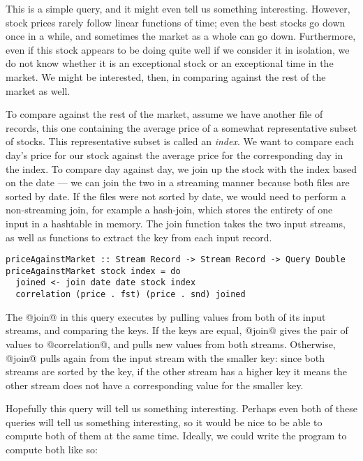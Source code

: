 This is a simple query, and it might even tell us something interesting.
However, stock prices rarely follow linear functions of time; even the best stocks go down once in a while, and sometimes the market as a whole can go down.
Furthermore, even if this stock appears to be doing quite well if we consider it in isolation, we do not know whether it is an exceptional stock or an exceptional time in the market.
We might be interested, then, in comparing against the rest of the market as well.

To compare against the rest of the market, assume we have another file of records, this one containing the average price of a somewhat representative subset of stocks.
This representative subset is called an \emph{index}.
We want to compare each day's price for our stock against the average price for the corresponding day in the index.
To compare day against day, we join up the stock with the index based on the date --- we can join the two in a streaming manner because both files are sorted by date.
If the files were not sorted by date, we would need to perform a non-streaming join, for example a hash-join, which stores the entirety of one input in a hashtable in memory.
The join function takes the two input streams, as well as functions to extract the key from each input record.


\begin{lstlisting}
priceAgainstMarket :: Stream Record -> Stream Record -> Query Double
priceAgainstMarket stock index = do
  joined <- join date date stock index
  correlation (price . fst) (price . snd) joined
\end{lstlisting}

The @join@ in this query executes by pulling values from both of its input streams, and comparing the keys.
If the keys are equal, @join@ gives the pair of values to @correlation@, and pulls new values from both streams.
Otherwise, @join@ pulls again from the input stream with the smaller key: since both streams are sorted by the key, if the other stream has a higher key it means the other stream does not have a corresponding value for the smaller key.

Hopefully this query will tell us something interesting.
Perhaps even both of these queries will tell us something interesting, so it would be nice to be able to compute both of them at the same time.
Ideally, we could write the program to compute both like so:

